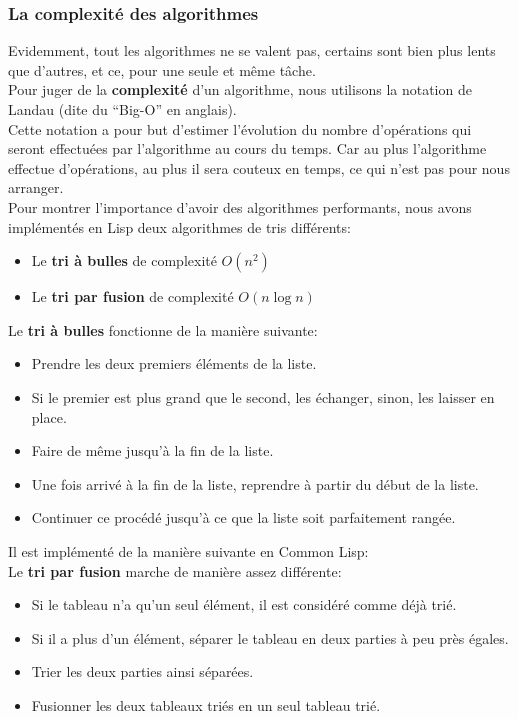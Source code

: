 \documentclass[a4paper, 12pt]{article}
\numberwithin{equation}{subsection}
\begin{document}
\subsubsection{La complexité des algorithmes}
Evidemment, tout les algorithmes ne se valent pas, certains sont bien plus lents que d'autres, et ce, pour une seule et même tâche.\\
Pour juger de la {\bf complexité} d'un algorithme, nous utilisons la notation de Landau (dite du ``Big-O'' en anglais). \\
Cette notation a pour but d'estimer l'évolution du nombre d'opérations qui seront effectuées par l'algorithme au cours du temps. Car au plus l'algorithme effectue d'opérations, au plus il sera couteux en temps, ce qui n'est pas pour nous arranger. \\[0.5cm]
Pour montrer l'importance d'avoir des algorithmes performants, nous avons implémentés en Lisp deux algorithmes de tris différents: \\[0.2cm]
\begin{itemize}
  \item Le {\bf tri à bulles} de complexité {\bf $O(n^{2})$}
  \item Le {\bf tri par fusion} de complexité {\bf $O(n\log{n})$}\\
\end{itemize}
Le {\bf tri à bulles} fonctionne de la manière suivante:
\begin{itemize}
  \item Prendre les deux premiers éléments de la liste.
  \item Si le premier est plus grand que le second, les échanger, sinon, les laisser en place.
  \item Faire de même jusqu'à la fin de la liste.
  \item Une fois arrivé à la fin de la liste, reprendre à partir du début de la liste.
  \item Continuer ce procédé jusqu'à ce que la liste soit parfaitement rangée.\\[0.2cm]
\end{itemize}
Il est implémenté de la manière suivante en Common Lisp: \\[0.2cm]

Le {\bf tri par fusion} marche de manière assez différente:
\begin{itemize}
  \item Si le tableau n'a qu'un seul élément, il est considéré comme déjà trié.
  \item Si il a plus d'un élément, séparer le tableau en deux parties à peu près égales.
  \item Trier les deux parties ainsi séparées.
  \item Fusionner les deux tableaux triés en un seul tableau trié. \\[0.2cm]
\end{itemize}
\end{document}
